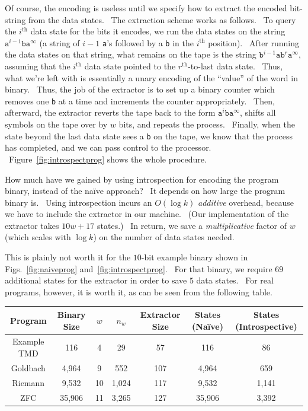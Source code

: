 \documentclass[11pt]{article}
\begin{document}
Of course, the encoding is useless until we specify how to extract the encoded bit-string from the data states. \ The extraction scheme works as follows. \ To query the $i^\textrm{th}$ data state for the bits it encodes, we run the data states on the string $\texttt{a}^{i-1}\texttt{b}\texttt{a}^{\infty}$ (a string of $i-1$ \texttt{a}'s followed by a \texttt{b} in the $i^\textrm{th}$ position). \ After running the data states on that string, what remains on the tape is the string $\texttt{b}^{i-1}\texttt{a}\texttt{b}^r\texttt{a}^{\infty}$, assuming that the $i^\textrm{th}$ data state pointed to the $r^\textrm{th}$-to-last data state. \ Thus, what we're left with is essentially a unary encoding of the ``value'' of the word in binary. \ Thus, the job of the extractor is to set up a binary counter which removes one \texttt{b} at a time and increments the counter appropriately. \ Then, afterward, the extractor reverts the tape back to the form $\texttt{a}^i\texttt{b}\texttt{a}^{\infty}$, shifts all symbols on the tape over by $w$ bits, and repeats the process. \ Finally, when the state beyond the last data state sees a \texttt{b} on the tape, we know that the process has completed, and we can pass control to the processor. \ Figure~\ref{fig:introspectprog} shows the whole procedure.

How much have we gained by using introspection for encoding the program binary, instead of the na\"ive approach? \ It depends on how large the program binary is. \ Using introspection incurs an $O(\log k)$ \emph{additive} overhead, because we have to include the extractor in our machine. \ (Our implementation of the extractor takes $10w + 17$ states.) \ In return, we save a \emph{multiplicative} factor of $w$ (which scales with $\log k$) on the number of data states needed.

This is plainly not worth it for the $10$-bit example binary shown in Figs.~\ref{fig:naiveprog} and~\ref{fig:introspectprog}. \ For that binary, we require $69$ additional states for the extractor in order to save $5$ data states. \ For real programs, however, it is worth it, as can be seen from the following table.

\begin{center}
    \begin{tabular}{||c c c c c c c||}
    \hline
    Program & Binary Size & $w$ & $n_w$ & Extractor Size & States (Na\"ive) & States (Introspective) \\ [0.5ex]
    \hline\hline
    Example TMD & 116 & 4 & 29 & 57 & 116 & 86 \\
    \hline
    Goldbach & 4,964 & 9 & 552 & 107 & 4,964 & 659 \\
    \hline
    Riemann & 9,532 & 10 & 1,024 & 117 & 9,532 & 1,141 \\
    \hline
    ZFC & 35,906 & 11 & 3,265 & 127 & 35,906 & 3,392 \\
    \hline
    \end{tabular}
\end{center}
\end{document}
